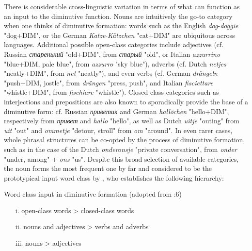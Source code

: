 There is considerable cross-linguistic variation in terms of what can function as an input to the diminutive function. Nouns are intuitively the go-to category when one thinks of diminutive formation: words such as the English \textit{dog}-\textit{doggie} "dog+DIM", or the German \textit{Katze}-\textit{Kätzchen} "cat+DIM" are ubiquitous across languages. Additional possible open-class categories include adjectives (cf. Russian \textit{старенький} "old+DIM", from \textit{старый} "old", or Italian \textit{azzurrino} "blue+DIM, pale blue", from \textit{azzurro} "sky blue"), adverbs (cf. Dutch \textit{netjes} "neatly+DIM", from \textit{net} "neatly"), and even verbs (cf. German \textit{drängeln} "push+DIM, jostle", from \textit{drängen} "press, push", and Italian \textit{fisciettare} "whistle+DIM", from \textit{fischiare} "whistle"). Closed-class categories such as interjections and prepositions are also known to sporadically provide the base of a diminutive form: cf. Russian \textit{приветик} and German \textit{hallöchen} "hello+DIM", respectively from \textit{привет} and \textit{hallo} "hello", as well as Dutch \textit{uitje} "outing" from \textit{uit} "out" and \textit{ommetje} "detour, stroll" from \textit{om} "around". In even rarer cases, whole phrasal structures can be co-opted by the process of diminutive formation, such as in the case of the Dutch \textit{onderonsje} "private conversation", from \textit{onder} "under, among" + \textit{ons} "us". Despite this broad selection of available categories, the noun forms the most frequent one by far and considered to be the prototypical input word class by \cite{Schneider+2003}, who establishes the following hierarchy:

\begin{exe}
\ex \label{ex:inputhierarchy}
Word class input in diminutive formation (adopted from \citeauthor{Schneider+2003} \citeyear{Schneider+2003}:6)
\begin{enumerate}
\item[i.] open-class words > closed-class words
\item[ii.] nouns and adjectives > verbs and adverbs
\item[iii.] nouns > adjectives
\end{enumerate}
\end{exe}

